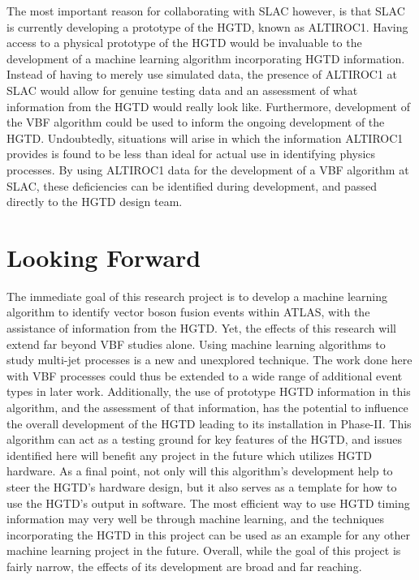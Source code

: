 \documentclass[12pt,letterpaper]{article}
\begin{document}
    The most important reason for collaborating with SLAC however, is that SLAC is currently developing a prototype of the HGTD, known as ALTIROC1. Having access to a physical prototype of the HGTD would be invaluable to the development of a machine learning algorithm incorporating HGTD information. Instead of having to merely use simulated data, the presence of ALTIROC1 at SLAC would allow for genuine testing data and an assessment of what information from the HGTD would really look like. Furthermore, development of the VBF algorithm could be used to inform the ongoing development of the HGTD. Undoubtedly, situations will arise in which the information ALTIROC1 provides is found to be less than ideal for actual use in identifying physics processes. By using ALTIROC1 data for the development of a VBF algorithm at SLAC, these deficiencies can be identified during development, and passed directly to the HGTD design team. 




\section*{Looking Forward}
    The immediate goal of this research project is to develop a machine learning algorithm to identify vector boson fusion events within ATLAS, with the assistance of information from the HGTD. Yet, the effects of this research will extend far beyond VBF studies alone. Using machine learning algorithms to study multi-jet processes is a new and unexplored technique. The work done here with VBF processes could thus be extended to a wide range of additional event types in later work. Additionally, the use of prototype HGTD information in this algorithm, and the assessment of that information, has the potential to influence the overall development of the HGTD leading to its installation in Phase-II. This algorithm can act as a testing ground for key features of the HGTD, and issues identified here will benefit any project in the future which utilizes HGTD hardware. As a final point, not only will this algorithm's development help to steer the HGTD's hardware design, but it also serves as a template for how to use the HGTD's output in software. The most efficient way to use HGTD timing information may very well be through machine learning, and the techniques incorporating the HGTD in this project can be used as an example for any other machine learning project in the future. Overall, while the goal of this project is fairly narrow, the effects of its development are broad and far reaching.




\newpage
\begin{appendix}
\end{appendix}





\end{document}
